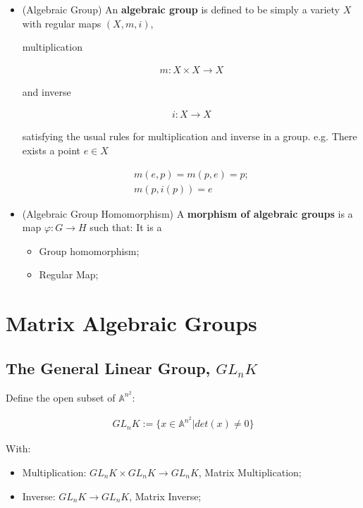 \documentclass[Total.tex]{subfiles}
\begin{document}
		\begin{Def}
			\begin{itemize}
				\item (Algebraic Group) An \textbf{algebraic group} is defined to be simply a variety $X$ with regular maps $(X,m,i)$,
				
				multiplication
				
				\begin{gather*}
					m:X\times X\rightarrow X
				\end{gather*}
				
				and inverse
				
				\begin{gather*}
					i:X\rightarrow X
				\end{gather*}
				
				satisfying the usual rules for multiplication and inverse in a group. e.g. There exists a point $e\in X$
				
				\begin{gather*}
					m(e,p)=m(p,e)=p;\\
					m(p,i(p))=e
				\end{gather*}
				
				\item (Algebraic Group Homomorphism) A \textbf{morphism of algebraic groups} is a map $\varphi:G\rightarrow H$ such that: It is a 
				
				\begin{itemize}
					\item Group homomorphism;
					\item Regular Map;
				\end{itemize}
			\end{itemize}
		\end{Def}
		\section{Matrix Algebraic Groups}
		\subsection{The General Linear Group, $GL_nK$}
		
		\begin{Def}
			Define the open subset of $\mathbb{A}^{n^2}$:
			
			\begin{gather*}
				GL_nK:=\{x\in \mathbb{A}^{n^2}|det(x)\not=0\}
			\end{gather*}
			
			With:
			
			\begin{itemize}
				\item Multiplication: $GL_nK\times GL_nK\rightarrow GL_nK$, Matrix Multiplication;
				\item Inverse: $GL_nK\rightarrow GL_nK$, Matrix Inverse;
			\end{itemize}
		\end{Def}
		
\end{document}
